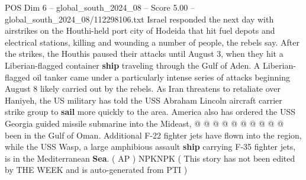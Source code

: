 \begin{textsample}{POS Dim 6 – global\_south\_2024\_08 – Score 5.00 – global\_south\_2024\_08/112298106.txt}
Israel responded the next day with airstrikes on the Houthi-held port city of Hodeida that hit fuel depots and electrical stations, killing and wounding a number of people, the rebels say.
After the strikes, the Houthis paused their attacks until August 3, when they hit a Liberian-flagged container \textbf{ship} traveling through the Gulf of Aden.
A Liberian-flagged oil tanker came under a particularly intense series of attacks beginning August 8 likely carried out by the rebels.
As Iran threatens to retaliate over Haniyeh, the US military has told the USS Abraham Lincoln aircraft carrier strike group to \textbf{sail} more quickly to the area.
America also has ordered the USS Georgia guided missile submarine into the Mideast, @ @ @ @ @ @ @ @ @ @ been in the Gulf of Oman.
Additional F-22 fighter jets have flown into the region, while the USS Wasp, a large amphibious assault \textbf{ship} carrying F-35 fighter jets, is in the Mediterranean \textbf{Sea}. ( AP ) NPKNPK ( This story has not been edited by THE WEEK and is auto-generated from PTI )

\end{textsample}
